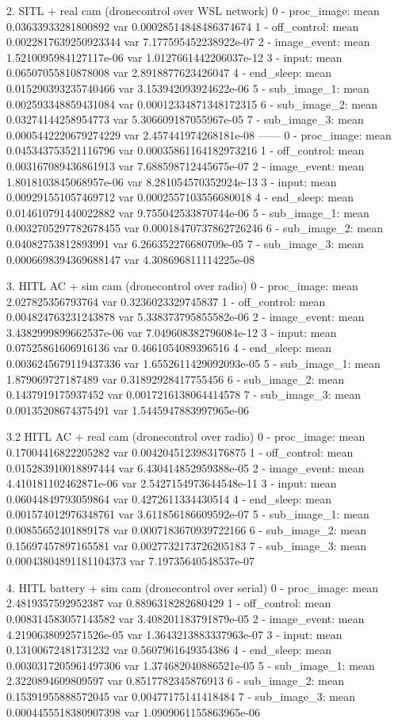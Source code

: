 2. SITL + real cam  (dronecontrol over WSL network)
0 - proc_image: mean 0.03633933281800892 var 0.00028514848486374674
1 - off_control: mean 0.0022817639250923344 var 7.177595452238922e-07
2 - image_event: mean 1.5210095984127117e-06 var 1.0127661442206037e-12
3 - input: mean 0.06507055810878008 var 2.8918877623426047
4 - end_sleep: mean 0.015290393235740466 var 3.153942093924622e-06
5 - sub_image_1: mean 0.002593348859431084 var 0.00012334871348172315
6 - sub_image_2: mean 0.03274144258954773 var 5.306609187055967e-05
7 - sub_image_3: mean 0.0005442220679274229 var 2.457441974268181e-08
------
0 - proc_image: mean 0.045343753521116796 var 0.00035861164182973216
1 - off_control: mean 0.003167089436861913 var 7.688598712445675e-07
2 - image_event: mean 1.8018103845068957e-06 var 8.281054570352924e-13
3 - input: mean 0.009291551057469712 var 0.0002557103556680018
4 - end_sleep: mean 0.014610791440022882 var 9.755042533870744e-06
5 - sub_image_1: mean 0.0032705297782678455 var 0.00018470737862726246
6 - sub_image_2: mean 0.04082753812893991 var 6.266352276680709e-05
7 - sub_image_3: mean 0.0006698394369688147 var 4.308696811114225e-08

3. HITL AC + sim cam 
        (dronecontrol over radio)
0 - proc_image: mean 2.027825356793764 var 0.3236023329745837
1 - off_control: mean 0.004824763231243878 var 5.338373795855582e-06
2 - image_event: mean 3.4382999899662537e-06 var 7.049608382796084e-12
3 - input: mean 0.07525861606916136 var 0.4661054089396516
4 - end_sleep: mean 0.0036245679119437336 var 1.6552611429092093e-05
5 - sub_image_1: mean 1.879069727187489 var 0.31892928417755456
6 - sub_image_2: mean 0.1437919175937452 var 0.0017216138064414578
7 - sub_image_3: mean 0.00135208674375491 var 1.5445947883997965e-06


3.2 HITL AC + real cam 
        (dronecontrol over radio)
0 - proc_image: mean 0.17004416822205282 var 0.0042045123983176875
1 - off_control: mean 0.015283910018897444 var 6.430414852959388e-05
2 - image_event: mean 4.410181102462871e-06 var 2.5427154973644548e-11
3 - input: mean 0.06044849793059864 var 0.4272611334430514
4 - end_sleep: mean 0.001574012976348761 var 3.611856186609592e-07
5 - sub_image_1: mean 0.00855652401889178 var 0.0007183670939722166
6 - sub_image_2: mean 0.15697457897165581 var 0.0027732173726205183
7 - sub_image_3: mean 0.00043804891181104373 var 7.19735640548537e-07

4. HITL battery + sim cam (dronecontrol over serial)
0 - proc_image: mean 2.4819357592952387 var 0.8896318282680429
1 - off_control: mean 0.008314583057143582 var 3.408201183791879e-05
2 - image_event: mean 4.2190638092571526e-05 var 1.3643213883337963e-07
3 - input: mean 0.13100672481731232 var 0.5607961649354386
4 - end_sleep: mean 0.0030317205961497306 var 1.374682040886521e-05
5 - sub_image_1: mean 2.3220894609809597 var 0.8517782345876913
6 - sub_image_2: mean 0.15391955888572045 var 0.00477175141418484
7 - sub_image_3: mean 0.0004455518380907398 var 1.0909061155863965e-06


